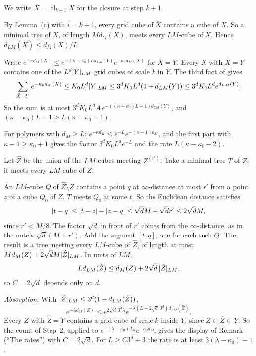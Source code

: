 \begin{detail}\label{xa:d-reblock}
We write $\bar X=\operatorname{cl}_{k+1}X$ for the closure at step $k+1$.
\begin{step}
By Lemma~(c) with $i=k+1$, every grid cube of $\bar X$ contains a cube of $X$. So a minimal tree of $X$, of length $Md_M(X)$, meets every $LM$-cube of $\bar X$. Hence $d_{LM}(\bar X)\le d_M(X)/L$.
\end{step}

\begin{step}
Write $e^{-\kappa d_M(X)}\le e^{-(\kappa-\kappa_0)Ld_{LM}(Y)}e^{-\kappa_0d_M(X)}$ for $\bar X=Y$. Every $X$ with $\bar X=Y$ contains one of the $L^d\lvert Y\rvert_{LM}$ grid cubes of scale $k$ in $Y$. The third fact of  gives
\[
\sum_{\bar X=Y}e^{-\kappa_0d_M(X)}\le K_0L^d\lvert Y\rvert_{LM}\le3^dK_0L^d(1+d_{LM}(Y))\le3^dK_0L^de^{d_{LM}(Y)}.
\]
So the sum is at most $3^dK_0L^dA\,e^{-((\kappa-\kappa_0)L-1)d_{LM}(Y)}$, and $(\kappa-\kappa_0)L-1\ge L(\kappa-\kappa_0-1)$.

For polymers with $d_M\ge L$: $e^{-\kappa d_M}\le e^{-L}e^{-(\kappa-1)d_M}$, and the first part with $\kappa-1\ge\kappa_0+1$ gives the factor $3^dK_0L^de^{-L}$ and the rate $L(\kappa-\kappa_0-2)$.
\end{step}

\begin{step}
Let $\hat Z$ be the union of the $LM$-cubes meeting $Z^{(r')}$. Take a minimal tree $T$ of $Z$; it meets every $LM$-cube of $\bar Z$.

An $LM$-cube $Q$ of $\hat Z\setminus\bar Z$ contains a point $q$ at $\infty$-distance at most $r'$ from a point $z$ of a cube $Q_0$ of $Z$. $T$ meets $Q_0$ at some $t$. So the Euclidean distance satisfies
\[
\lvert t-q\rvert\le\lvert t-z\rvert+\lvert z-q\rvert\le\sqrt dM+\sqrt dr'\le2\sqrt dM,
\]
since $r'<M/8$. The factor $\sqrt d$ in front of $r'$ comes from the $\infty$-distance, as in the note's $\sqrt d(M+r')$. Add the segment $[t,q]$, one for each such $Q$. The result is a tree meeting every $LM$-cube of $\hat Z$, of length at most $Md_M(Z)+2\sqrt dM\lvert\hat Z\rvert_{LM}$. In units of $LM$,
\[
Ld_{LM}(\hat Z)\le d_M(Z)+2\sqrt d\,\lvert\hat Z\rvert_{LM},
\]
so $C=2\sqrt d$ depends only on $d$.

\emph{Absorption.} With $\lvert\hat Z\rvert_{LM}\le3^d(1+d_{LM}(\hat Z))$,
\[
e^{-\lambda d_M(Z)}\le e^{2\sqrt d\,3^d\lambda}e^{-\lambda(L-2\sqrt d\,3^d)d_{LM}(\hat Z)}.
\]
Every $Z$ with $\hat Z=Y$ contains a grid cube of scale $k$ inside $Y$, since $Z\subset\bar Z\subset Y$. So the count of Step~2, applied to $e^{-(\lambda-\kappa_0)d_M}e^{-\kappa_0d_M}$, gives the display of Remark~ (``The rates'') with $C=2\sqrt d$. For $L\ge C3^d+3$ the rate is at least $3(\lambda-\kappa_0)-1$.
\end{step}
\end{detail}

